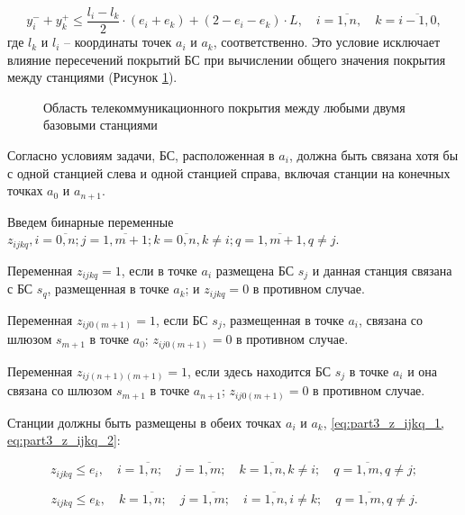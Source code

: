 \begin{equation}
  \label{eq:part3_yi_4}
  y_i^- + y_k^+  \leq \frac{l_i-l_k}{2} \cdot (e_i + e_k) + (2 - e_i - e_k) \cdot L, \quad i = \overline{1,n}, \quad k = \overline{i-1,0},
\end{equation}
где $ l_k $ и $ l_i $ -- координаты точек $ a_i $ и $ a_k $, соответственно. Это условие исключает влияние пересечений покрытий БС при вычислении общего значения покрытия между станциями (Рисунок \cref{fig:part3_total_coverage_between_points}).

\begin{figure}[ht]
  \caption{Область телекоммуникационного покрытия между любыми двумя базовыми станциями}\label{fig:part3_total_coverage_between_points}
\end{figure}

Согласно условиям задачи, БС, расположенная в $ a_i $, должна быть связана хотя бы с одной станцией слева и одной станцией справа, включая станции на конечных точках $ a_0 $ и $a_{n + 1}$. 

Введем бинарные переменные $z_{ijkq}, i = \overline{0,n}; j= \overline{1,m+1}; k=\overline{0,n},  k \neq i; q= \overline{1,m+1}, q \neq j$.

Переменная $ z_ {ijkq} = 1$, если в точке $ a_i $ размещена БС $ s_j $ и данная станция связана с БС $ s_q $, размещенная в точке $ a_k $; и $ z_ {ijkq} = 0 $ в противном случае.

Переменная $ z_{ij0(m + 1)} = 1$, если БС $ s_j $, размещенная в точке $ a_i $, связана со шлюзом $ s_{m + 1} $ в точке $ a_0 $; $ z_{ij0 (m + 1)} = 0 $ в противном случае.
 
Переменная $ z_{ij(n + 1)(m + 1)} = 1 $, если здесь находится БС $ s_j $ в точке $ a_i $ и она связана со шлюзом $ s_{m + 1} $ в точке $ a_{n + 1} $; $ z_{ij0(m + 1)} = 0 $  в противном случае.

Станции должны быть размещены в обеих точках $ a_i $ и $ a_k $, \cref{eq:part3_z_ijkq_1, eq:part3_z_ijkq_2}:

\begin{equation}
  \label{eq:part3_z_ijkq_1}
  z_{ijkq} \leq e_i , \quad i = \overline{1, n}; \quad j = \overline{1, m}; \quad k = \overline{1,n}, k \neq i; \quad q = \overline{1,m}, q \neq j;
\end{equation}


\begin{equation}
  \label{eq:part3_z_ijkq_2}
  z_{ijkq} \leq e_k , \quad k = \overline{1, n}; \quad j = \overline{1, m}; \quad i = \overline{1,n}, i \neq k; \quad q = \overline{1,m}, q \neq j.
\end{equation}

